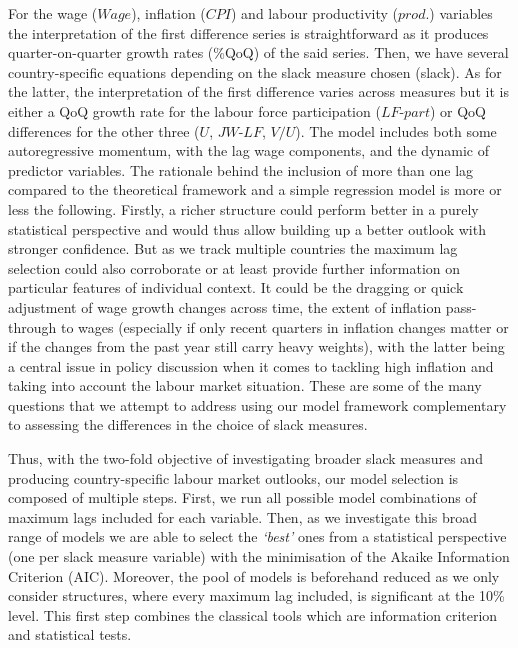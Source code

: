 For the wage ($Wage$), inflation ($CPI$) and labour productivity ($prod.$) variables the interpretation of the first difference series is straightforward as it produces quarter-on-quarter growth rates (\%QoQ) of the said series. 
Then, we have several country-specific equations depending on the slack measure chosen (slack). 
As for the latter, the interpretation of the first difference varies across measures but it is either a QoQ growth rate for the labour force participation ($LF\textrm{-}part$) or QoQ differences for the other three ($U$, $JW\textrm{-}LF$, $V/U$). 
The model includes both some autoregressive momentum, with the lag wage components, and the dynamic of predictor variables. 
The rationale behind the inclusion of more than one lag compared to the theoretical framework and a simple regression model is more or less the following. 
Firstly, a richer structure could perform better in a purely statistical perspective and would thus allow building up a better outlook with stronger confidence. 
But as we track multiple countries the maximum lag selection could also corroborate or at least provide further information on particular features of individual context. It could be the dragging or quick adjustment of wage growth changes across time, the extent of inflation pass-through to wages (especially if only recent quarters in inflation changes matter or if the changes from the past year still carry heavy weights), with the latter being a central issue in policy discussion when it comes to tackling high inflation and taking into account the labour market situation. 
These are some of the many questions that we attempt to address using our model framework complementary to assessing the differences in the choice of slack measures.

Thus, with the two-fold objective of investigating broader slack measures and producing country-specific labour market outlooks, our model selection is composed of multiple steps. 
First, we run all possible model combinations of maximum lags included for each variable. 
Then, as we investigate this broad range of models we are able to select the \textit{‘best’} ones from a statistical perspective (one per slack measure variable) with the minimisation of the Akaike Information Criterion (AIC). 
Moreover, the pool of models is beforehand reduced as we only consider structures, where every maximum lag included, is significant at the 10\% level. 
This first step combines the classical tools which are information criterion and statistical tests.

